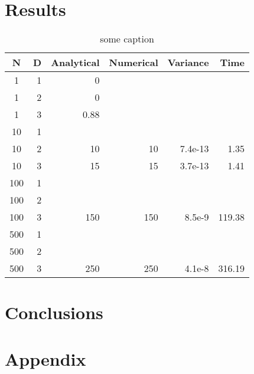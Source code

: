 \documentclass[english, a4paper]{article}
\begin{document}
\section{Results}

\begin{table}[H]
  \centering
  \begin{tabular}{ | c | r | r | r | r | r |}
    \hline
    N &D &Analytical &Numerical &Variance &Time \\*
    \hline
    1& 1& 0  \\*
    \hline
    1& 2& 0  \\*
    \hline
    1& 3& 0.88 \\*
    \hline
    10& 1&  \\*
    \hline
    10& 2& 10 &10 &7.4e-13 &1.35 \\*
    \hline
    10 &3 &15 &15 &3.7e-13 &1.41 \\*
    \hline
    100& 1&  \\*
    \hline
    100& 2&  \\*
    \hline
    100& 3& 150 &150 &8.5e-9 &119.38  \\*
    \hline
    500& 1&  \\*
    \hline
    500& 2&  \\*
    \hline
    500& 3& 250 &250 &4.1e-8 &316.19   \\*
    \hline
  \end{tabular}
  \caption{some caption}
  \label{tab:Tabell1}
\end{table}

\section{Conclusions}


\section{Appendix}


\end{document}
